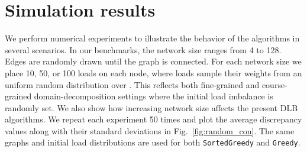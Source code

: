 \documentclass[12pt,psfig,a4]{article}
\newcommand{\sg}{\texttt{SortedGreedy}}
\newcommand{\gr}{\texttt{Greedy}}
\theoremstyle{plain}
\begin{document}
\section{Simulation results}
\label{sec:sims}
We perform numerical experiments to illustrate the behavior of the algorithms in several scenarios. In our benchmarks, the network size  ranges from 4 to 128. Edges are randomly drawn until the graph is connected. For each network size we place 10, 50, or 100 loads on each node, where loads sample their weights from an uniform random distribution over . This reflects both fine-grained and course-grained domain-decomposition settings where the initial load imbalance is randomly set. We also show how increasing network size affects the present DLB algorithms. We repeat each experiment 50 times and plot the average discrepancy values along with their standard deviations in Fig.~\ref{fig:random_con}. The same graphs and initial load distributions are used for both \sg{} and \gr{}.
\end{document}
